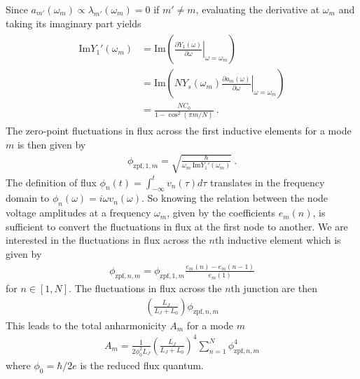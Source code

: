 Since $a_{m'}(\omega_m)\propto \lambda_{m'}(\omega_m) = 0$ if $m'\ne m$, evaluating the derivative at $\omega_m$ and taking its imaginary part yields
\begin{align}
\begin{split}
\text{Im}Y_1'(\omega_m)&=\text{Im}\left(\left.\frac{\partial Y_{1}(\omega)}{\partial\omega}\right|_{\omega = \omega_m}\right)\\
&=  \text{Im}\left(NY_s(\omega_m)\left. \frac{\partial a_m(\omega)}{\partial\omega}\right|_{\omega = \omega_m}\right)\\
&=\frac{N C_0}{1-\cos^2 (\pi m/ N)}\ .
\label{eq:anh-y1p}
\end{split}
\end{align}
The zero-point fluctuations in flux across the first inductive elements for a mode $m$ is then given by \cite{gelyQuCATQuantumCircuit2019,niggBlackBoxSuperconductingCircuit2012}
\begin{align}
\phi_{\text{zpf},1,m} = \sqrt{\frac{\hbar}{\omega_m~\text{Im}Y_1'(\omega_m)}}\ .
\end{align}
The definition of flux \cite{vool_introductionquantum_2017} $\phi_n(t) = \int_{-\infty}^tv_n(\tau)d\tau$ translates in the frequency domain to $\phi_n(\omega) = i\omega v_n(\omega)$.
%
So knowing the relation between the node voltage amplitudes at a frequency $\omega_m$, given by the coefficients $e_m(n)$, is sufficient to convert the fluctuations in flux at the first node to another.
%
We are interested in the fluctuations in flux across the $n$th inductive element which is given by
\begin{align}
\phi_{\text{zpf},n,m} = \phi_{\text{zpf},1,m}\frac{e_m(n)-e_m(n-1)}{e_m(1)}
\end{align}
for $n\in[1,N]$.
%
The fluctuations in flux across the $n$th junction are then
\begin{align}
\left(\frac{L_J}{L_J+L_0}\right)\phi_{\text{zpf},n,m}
\end{align}
%
This leads to the total anharmonicity $A_m$ for a mode $m$
\begin{align}
A_m = \frac{1}{2\phi_0^2L_J}\left(\frac{L_J}{L_J+L_0}\right)^4\sum_{n=1}^{N}\phi_{\text{zpf},n,m}^4
\label{eq:anh-qucat}
\end{align}
where $\phi_0 = \hbar/2e$ is the reduced flux quantum.

